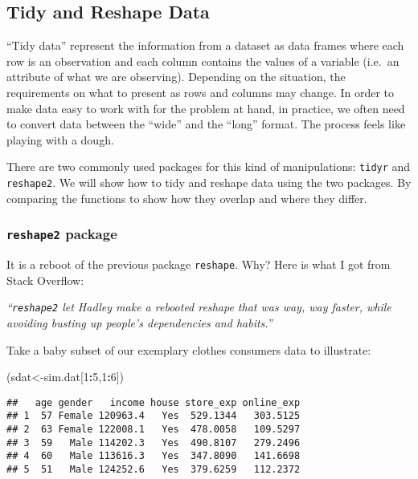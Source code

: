 \documentclass[
]{article}
\newenvironment{Shaded}{\begin{snugshade}}{\end{snugshade}}
\newcommand{\DecValTok}[1]{\textcolor[rgb]{0.00,0.00,0.81}{#1}}
\newcommand{\NormalTok}[1]{#1}
\newcommand{\OperatorTok}[1]{\textcolor[rgb]{0.81,0.36,0.00}{\textbf{#1}}}
\begin{document}
\hypertarget{tidy-and-reshape-data}{%
\subsection{Tidy and Reshape Data}\label{tidy-and-reshape-data}}

``Tidy data'' represent the information from a dataset as data frames
where each row is an observation and each column contains the values of
a variable (i.e.~an attribute of what we are observing). Depending on
the situation, the requirements on what to present as rows and columns
may change. In order to make data easy to work with for the problem at
hand, in practice, we often need to convert data between the ``wide''
and the ``long'' format. The process feels like playing with a dough.

There are two commonly used packages for this kind of manipulations:
\texttt{tidyr} and \texttt{reshape2}. We will show how to tidy and
reshape data using the two packages. By comparing the functions to show
how they overlap and where they differ.

\hypertarget{reshape2-package}{%
\subsubsection{\texorpdfstring{\texttt{reshape2}
package}{reshape2 package}}\label{reshape2-package}}

It is a reboot of the previous package \texttt{reshape}. Why? Here is
what I got from Stack Overflow:

\emph{``\texttt{reshape2} let Hadley make a rebooted reshape that was
way, way faster, while avoiding busting up people's dependencies and
habits.''}

Take a baby subset of our exemplary clothes consumers data to
illustrate:

\begin{Shaded}
\begin{Highlighting}[]
\NormalTok{(sdat<-sim.dat[}\DecValTok{1}\OperatorTok{:}\DecValTok{5}\NormalTok{,}\DecValTok{1}\OperatorTok{:}\DecValTok{6}\NormalTok{])}
\end{Highlighting}
\end{Shaded}

\begin{verbatim}
##   age gender   income house store_exp online_exp
## 1  57 Female 120963.4   Yes  529.1344   303.5125
## 2  63 Female 122008.1   Yes  478.0058   109.5297
## 3  59   Male 114202.3   Yes  490.8107   279.2496
## 4  60   Male 113616.3   Yes  347.8090   141.6698
## 5  51   Male 124252.6   Yes  379.6259   112.2372
\end{verbatim}
\end{document}
